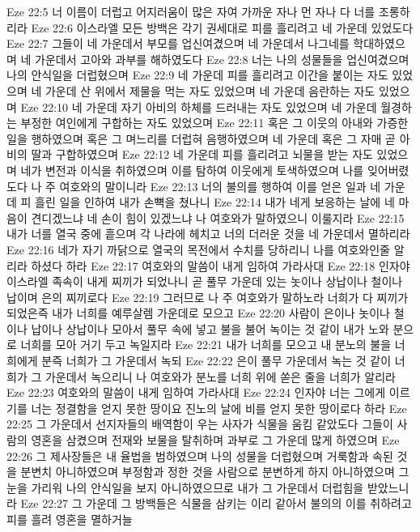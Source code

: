 Eze 22:5  너 이름이 더럽고 어지러움이 많은 자여 가까운 자나 먼 자나 다 너를 조롱하리라
Eze 22:6  이스라엘 모든 방백은 각기 권세대로 피를 흘리려고 네 가운데 있었도다
Eze 22:7  그들이 네 가운데서 부모를 업신여겼으며 네 가운데서 나그네를 학대하였으며 네 가운데서 고아와 과부를 해하였도다
Eze 22:8  너는 나의 성물들을 업신여겼으며 나의 안식일을 더럽혔으며
Eze 22:9  네 가운데 피를 흘리려고 이간을 붙이는 자도 있었으며 네 가운데 산 위에서 제물을 먹는 자도 있었으며 네 가운데 음란하는 자도 있었으며
Eze 22:10  네 가운데 자기 아비의 하체를 드러내는 자도 있었으며 네 가운데 월경하는 부정한 여인에게 구합하는 자도 있었으며
Eze 22:11  혹은 그 이웃의 아내와 가증한 일을 행하였으며 혹은 그 며느리를 더럽혀 음행하였으며 네 가운데 혹은 그 자매 곧 아비의 딸과 구합하였으며
Eze 22:12  네 가운데 피를 흘리려고 뇌물을 받는 자도 있었으며 네가 변전과 이식을 취하였으며 이를 탐하여 이웃에게 토색하였으며 나를 잊어버렸도다 나 주 여호와의 말이니라
Eze 22:13  너의 불의를 행하여 이를 얻은 일과 네 가운데 피 흘린 일을 인하여 내가 손뼉을 쳤나니
Eze 22:14  내가 네게 보응하는 날에 네 마음이 견디겠느냐 네 손이 힘이 있겠느냐 나 여호와가 말하였으니 이룰지라
Eze 22:15  내가 너를 열국 중에 흩으며 각 나라에 헤치고 너의 더러운 것을 네 가운데서 멸하리라
Eze 22:16  네가 자기 까닭으로 열국의 목전에서 수치를 당하리니 나를 여호와인줄 알리라 하셨다 하라
Eze 22:17  여호와의 말씀이 내게 임하여 가라사대
Eze 22:18  인자야 이스라엘 족속이 내게 찌끼가 되었나니 곧 풀무 가운데 있는 놋이나 상납이나 철이나 납이며 은의 찌끼로다
Eze 22:19  그러므로 나 주 여호와가 말하노라 너희가 다 찌끼가 되었은즉 내가 너희를 예루살렘 가운데로 모으고
Eze 22:20  사람이 은이나 놋이나 철이나 납이나 상납이나 모아서 풀무 속에 넣고 불을 불어 녹이는 것 같이 내가 노와 분으로 너희를 모아 거기 두고 녹일지라
Eze 22:21  내가 너희를 모으고 내 분노의 불을 너희에게 분즉 너희가 그 가운데서 녹되
Eze 22:22  은이 풀무 가운데서 녹는 것 같이 너희가 그 가운데서 녹으리니 나 여호와가 분노를 너희 위에 쏟은 줄을 너희가 알리라
Eze 22:23  여호와의 말씀이 내게 임하여 가라사대
Eze 22:24  인자야 너는 그에게 이르기를 너는 정결함을 얻지 못한 땅이요 진노의 날에 비를 얻지 못한 땅이로다 하라
Eze 22:25  그 가운데서 선지자들의 배역함이 우는 사자가 식물을 움킴 같았도다 그들이 사람의 영혼을 삼켰으며 전재와 보물을 탈취하며 과부로 그 가운데 많게 하였으며
Eze 22:26  그 제사장들은 내 율법을 범하였으며 나의 성물을 더럽혔으며 거룩함과 속된 것을 분변치 아니하였으며 부정함과 정한 것을 사람으로 분변하게 하지 아니하였으며 그 눈을 가리워 나의 안식일을 보지 아니하였으므로 내가 그 가운데서 더럽힘을 받았느니라
Eze 22:27  그 가운데 그 방백들은 식물을 삼키는 이리 같아서 불의의 이를 취하려고 피를 흘려 영혼을 멸하거늘
